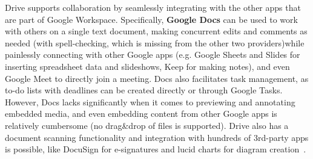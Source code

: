Drive supports collaboration by seamlessly integrating with the other apps that are part of Google Workspace. Specifically, \textbf{Google Docs} can be used to work with others on a single text document, making concurrent edits  and comments as needed (with spell-checking, which is missing from the other two providers)while painlessly connecting with other Google apps (e.g. Google Sheets and Slides for inserting spreadsheet data and slideshows,  Keep for making notes), and even Google Meet to directly join a meeting. Docs also facilitates task management, as to-do lists with deadlines can be created directly or through Google Tasks. However, Docs lacks significantly when it comes to previewing and annotating embedded media, and even embedding content from other Google apps is relatively cumbersome (no drag\&drop of files is supported).  Drive also has a document scanning functionality and integration with hundreds of 3rd-party apps is possible, like DocuSign for e-signatures and lucid charts for diagram creation~\cite{google_drive,google_docs,google_apps}.


